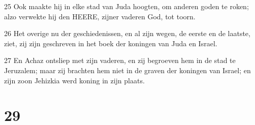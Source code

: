 \par 25 Ook maakte hij in elke stad van Juda hoogten, om anderen goden te roken; alzo verwekte hij den HEERE, zijner vaderen God, tot toorn.
\par 26 Het overige nu der geschiedenissen, en al zijn wegen, de eerste en de laatste, ziet, zij zijn geschreven in het boek der koningen van Juda en Israel.
\par 27 En Achaz ontsliep met zijn vaderen, en zij begroeven hem in de stad te Jeruzalem; maar zij brachten hem niet in de graven der koningen van Israel; en zijn zoon Jehizkia werd koning in zijn plaats.

\chapter{29}

